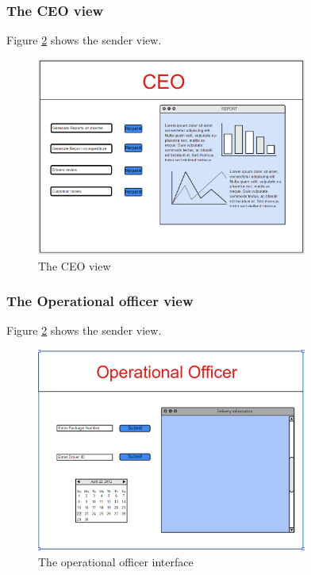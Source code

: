 \documentclass[paper=a4, fontsize=11pt]{scrartcl} %
\numberwithin{equation}{section} %
\numberwithin{figure}{section} %
\numberwithin{table}{section} %
\begin{document}
\subsubsection{The CEO view}
Figure \ref{Sender} shows the sender view.
\begin{figure}[h!]
\centering
\includegraphics[width=3.5in]{pictures/CEO.png}
\caption{The CEO view}
\label{Sender}
\end{figure}

\subsubsection{The Operational officer view}
Figure \ref{Sender} shows the sender view.
\begin{figure}[h!]
\centering
\includegraphics[width=3.5in]{pictures/operational.png}
\caption{The operational officer interface}
\label{Sender}
\end{figure}
\end{document}
